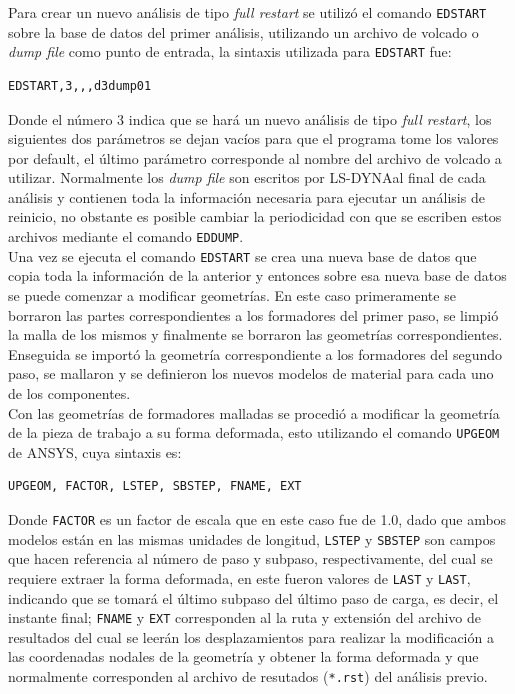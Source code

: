 Para crear un nuevo análisis de tipo \textit{full restart} se utilizó el comando \texttt{EDSTART} sobre la 
base de datos del primer análisis, utilizando un archivo de volcado o \textit{dump file} como punto de entrada, 
la sintaxis utilizada para \texttt{EDSTART} fue:

\begin{verbatim}
EDSTART,3,,,d3dump01
\end{verbatim}

Donde el número 3 indica que se hará un nuevo análisis de tipo \textit{full restart}, los siguientes dos parámetros 
se dejan vacíos para que el programa tome los valores por default, el último parámetro corresponde al nombre del 
archivo de volcado a utilizar. Normalmente los \textit{dump file} son escritos por LS-DYNA\CR al final de 
cada análisis y contienen toda la información necesaria para ejecutar un análisis de reinicio, no obstante es posible 
cambiar la periodicidad con que se escriben estos archivos mediante el comando \texttt{EDDUMP}. ~\cite{ansys-command} \\

Una vez se ejecuta el comando \texttt{EDSTART} se crea una nueva base de datos que copia toda la información de 
la anterior y entonces sobre esa nueva base de datos se puede comenzar a modificar geometrías. En este caso 
primeramente se borraron las partes correspondientes a los formadores del primer paso, se limpió la malla de 
los mismos y finalmente se borraron las geometrías correspondientes. Enseguida se importó la geometría 
correspondiente a los formadores del segundo paso, se mallaron y se definieron los nuevos modelos 
de material para cada uno de los componentes.\\

Con las geometrías de formadores malladas se procedió a modificar la geometría de la pieza de trabajo a su 
forma deformada, esto utilizando el comando \texttt{UPGEOM} de ANSYS\CR, cuya sintaxis es:  ~\cite{ansys-command}

\begin{verbatim}
UPGEOM, FACTOR, LSTEP, SBSTEP, FNAME, EXT
\end{verbatim}

Donde \texttt{FACTOR} es un factor de escala que en este caso fue de 1.0, dado que ambos modelos están en 
las mismas unidades de longitud, \texttt{LSTEP} y \texttt{SBSTEP} son campos que hacen referencia al número 
de paso y subpaso, respectivamente, del cual se requiere extraer la forma deformada, en este fueron valores 
de \texttt{LAST} y \texttt{LAST}, indicando que se tomará el último subpaso del último paso de carga, es decir, el instante 
final; \texttt{FNAME} y \texttt{EXT} corresponden al la ruta y extensión del archivo de resultados del cual 
se leerán los desplazamientos para realizar la modificación a las coordenadas nodales de la geometría y 
obtener la forma deformada y que normalmente corresponden al archivo de resutados (\texttt{*.rst}) del análisis previo. \\

